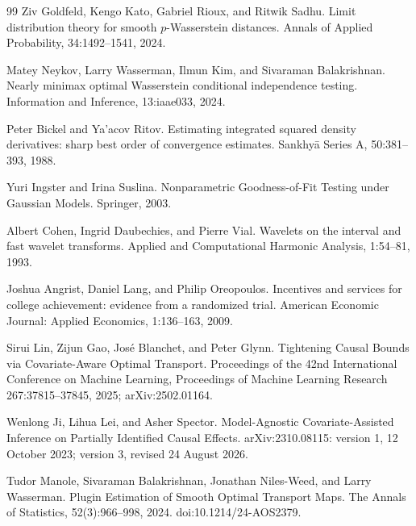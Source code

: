 \documentclass{article}
\begin{document}
\begin{thebibliography}{99}
   Ziv Goldfeld, Kengo Kato, Gabriel Rioux, and Ritwik Sadhu. Limit distribution theory for smooth \(p\)-Wasserstein distances. Annals of Applied Probability, 34:1492--1541, 2024.

   Matey Neykov, Larry Wasserman, Ilmun Kim, and Sivaraman Balakrishnan. Nearly minimax optimal Wasserstein conditional independence testing. Information and Inference, 13:iaae033, 2024.

   Peter Bickel and Ya'acov Ritov. Estimating integrated squared density derivatives: sharp best order of convergence estimates. Sankhy\=a Series A, 50:381--393, 1988.

   Yuri Ingster and Irina Suslina. Nonparametric Goodness-of-Fit Testing under Gaussian Models. Springer, 2003.

   Albert Cohen, Ingrid Daubechies, and Pierre Vial. Wavelets on the interval and fast wavelet transforms. Applied and Computational Harmonic Analysis, 1:54--81, 1993.

   Joshua Angrist, Daniel Lang, and Philip Oreopoulos. Incentives and services for college achievement: evidence from a randomized trial. American Economic Journal: Applied Economics, 1:136--163, 2009.

   Sirui Lin, Zijun Gao, Jos\'e Blanchet, and Peter Glynn. Tightening Causal Bounds via Covariate-Aware Optimal Transport. Proceedings of the 42nd International Conference on Machine Learning, Proceedings of Machine Learning Research 267:37815--37845, 2025; arXiv:2502.01164.

   Wenlong Ji, Lihua Lei, and Asher Spector. Model-Agnostic Covariate-Assisted Inference on Partially Identified Causal Effects. arXiv:2310.08115: version 1, 12 October 2023; version 3, revised 24 August 2026.

   Tudor Manole, Sivaraman Balakrishnan, Jonathan Niles-Weed, and Larry Wasserman. Plugin Estimation of Smooth Optimal Transport Maps. The Annals of Statistics, 52(3):966--998, 2024. doi:10.1214/24-AOS2379.

\end{thebibliography}
\end{document}
